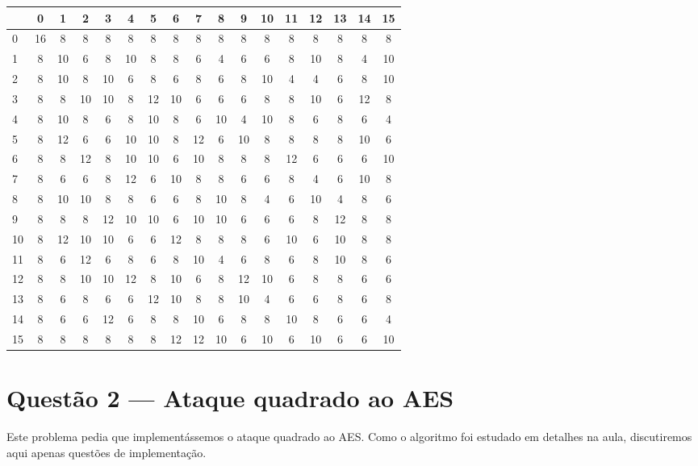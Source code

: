\documentclass{article}
\begin{document}
\begin{tabular}{l | *{16}c}
  &  0 &  1 &  2 &  3 &  4 &  5 &  6 &  7 &  8 &  9 & 10 & 11 & 12 & 13 & 14 & 15 \\
\hline
0 & 16 &  8 &  8 &  8 &  8 &  8 &  8 &  8 &  8 &  8 &  8 &  8 &  8 &  8 &  8 &  8 \\
1 &  8 & 10 &  6 &  8 & 10 &  8 &  8 &  6 &  4 &  6 &  6 &  8 & 10 &  8 &  4 & 10 \\
2 &  8 & 10 &  8 & 10 &  6 &  8 &  6 &  8 &  6 &  8 & 10 &  4 &  4 &  6 &  8 & 10 \\
3 &  8 &  8 & 10 & 10 &  8 & 12 & 10 &  6 &  6 &  6 &  8 &  8 & 10 &  6 & 12 &  8 \\
4 &  8 & 10 &  8 &  6 &  8 & 10 &  8 &  6 & 10 &  4 & 10 &  8 &  6 &  8 &  6 &  4 \\
5 &  8 & 12 &  6 &  6 & 10 & 10 &  8 & 12 &  6 & 10 &  8 &  8 &  8 &  8 & 10 &  6 \\
6 &  8 &  8 & 12 &  8 & 10 & 10 &  6 & 10 &  8 &  8 &  8 & 12 &  6 &  6 &  6 & 10 \\
7 &  8 &  6 &  6 &  8 & 12 &  6 & 10 &  8 &  8 &  6 &  6 &  8 &  4 &  6 & 10 &  8 \\
8 &  8 & 10 & 10 &  8 &  8 &  6 &  6 &  8 & 10 &  8 &  4 &  6 & 10 &  4 &  8 &  6 \\
9 &  8 &  8 &  8 & 12 & 10 & 10 &  6 & 10 & 10 &  6 &  6 &  6 &  8 & 12 &  8 &  8 \\
10 & 8 & 12 & 10 & 10 &  6 &  6 & 12 &  8 &  8 &  8 &  6 & 10 &  6 & 10 &  8 &  8 \\
11 & 8 &  6 & 12 &  6 &  8 &  6 &  8 & 10 &  4 &  6 &  8 &  6 &  8 & 10 &  8 &  6 \\
12 & 8 &  8 & 10 & 10 & 12 &  8 & 10 &  6 &  8 & 12 & 10 &  6 &  8 &  8 &  6 &  6 \\
13 & 8 &  6 &  8 &  6 &  6 & 12 & 10 &  8 &  8 & 10 &  4 &  6 &  6 &  8 &  6 &  8 \\
14 & 8 &  6 &  6 & 12 &  6 &  8 &  8 & 10 &  6 &  8 &  8 & 10 &  8 &  6 &  6 &  4 \\
15 & 8 &  8 &  8 &  8 &  8 &  8 & 12 & 12 & 10 &  6 & 10 &  6 & 10 &  6 &  6 & 10 \\
\end{tabular}



\section{Questão 2 --- Ataque quadrado ao AES}

Este problema pedia que implementássemos o ataque quadrado ao AES.
Como o algoritmo foi estudado em detalhes na aula,
discutiremos aqui apenas questões de implementação.
\end{document}
